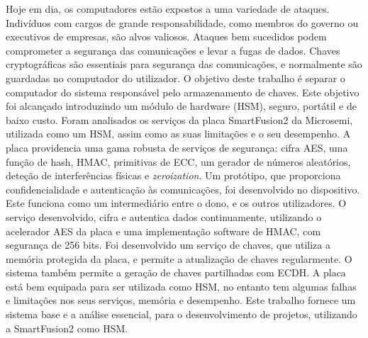\noindent Hoje em dia, os computadores estão expostos a uma variedade de ataques. Indivíduos com cargos de grande responsabilidade, como membros do governo ou executivos de empresas, são alvos valiosos. Ataques bem sucedidos podem comprometer a segurança das comunicações e levar a fugas de dados. Chaves cryptográficas são essentiais para segurança das comunicações, e normalmente são guardadas no computador do utilizador. O objetivo deste trabalho é separar o computador do sistema responsável pelo armazenamento de chaves. Este objetivo foi alcançado introduzindo um módulo de hardware (HSM), seguro, portátil e de baixo custo. Foram analisados os serviços da placa SmartFusion2 da Microsemi, utilizada como um HSM, assim como as suas limitações e o seu desempenho. A placa providencia uma gama robusta de serviços de segurança: cifra AES, uma função de hash, HMAC, primitivas de ECC, um gerador de números aleatórios, deteção de interferências físicas e \textit{zeroization}. Um protótipo, que proporciona confidencialidade e autenticação às comunicações, foi desenvolvido no dispositivo. Este funciona como um intermediário entre o dono, e os outros utilizadores. O serviço desenvolvido, cifra e autentica dados continuamente, utilizando o acelerador AES da placa e uma implementação software de HMAC, com segurança de 256 bits. Foi desenvolvido um serviço de chaves, que utiliza a memória protegida da placa, e permite a atualização de chaves regularmente. O sistema também permite a geração de chaves partilhadas com ECDH. A placa está bem equipada para ser utilizada como HSM, no entanto tem algumas falhas e limitações nos seus serviços, memória e desempenho. Este trabalho fornece um sistema base e a análise essencial, para o desenvolvimento de projetos, utilizando a SmartFusion2 como HSM.
